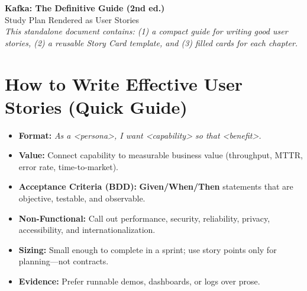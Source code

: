 \documentclass[11pt,a4paper]{article}
\begin{document}
\begin{center}
  {\LARGE \textbf{Kafka: The Definitive Guide (2nd ed.)} \\[4pt]
  \large Study Plan Rendered as User Stories}\\[6pt]
  \normalsize \textit{This standalone document contains: (1) a compact guide for writing good user stories, (2) a reusable Story Card template, and (3) filled cards for each chapter.}
\end{center}

\section*{How to Write Effective User Stories (Quick Guide)}
\begin{itemize}[leftmargin=1.2em]
  \item \textbf{Format:} \emph{As a <persona>, I want <capability> so that <benefit>.}
  \item \textbf{Value:} Connect capability to measurable business value (throughput, MTTR, error rate, time-to-market).
  \item \textbf{Acceptance Criteria (BDD):} \textbf{Given/When/Then} statements that are objective, testable, and observable.
  \item \textbf{Non-Functional:} Call out performance, security, reliability, privacy, accessibility, and internationalization.
  \item \textbf{Sizing:} Small enough to complete in a sprint; use story points only for planning---not contracts.
  \item \textbf{Evidence:} Prefer runnable demos, dashboards, or logs over prose.
\end{itemize}
\clearpage
\end{document}
